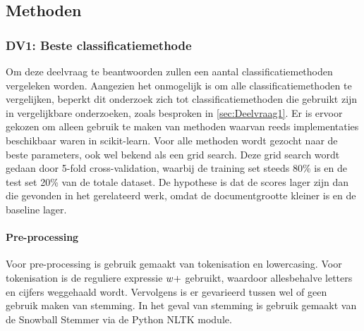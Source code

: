 \subsection{Methoden}


\subsubsection{DV1: Beste classificatiemethode}
Om deze deelvraag te beantwoorden zullen een aantal classificatiemethoden vergeleken worden. Aangezien het onmogelijk is om alle classificatiemethoden te vergelijken, beperkt dit onderzoek zich tot classificatiemethoden die gebruikt zijn in vergelijkbare onderzoeken, zoals besproken in \ref{sec:Deelvraag1}. Er is ervoor gekozen om alleen gebruik te maken van methoden waarvan reeds implementaties beschikbaar waren in scikit-learn. Voor alle methoden wordt gezocht naar de beste parameters, ook wel bekend als een grid search. Deze grid search wordt gedaan door 5-fold cross-validation, waarbij de training set steeds 80\% is en de test set 20\% van de totale dataset. De hypothese is dat de scores lager zijn dan die gevonden in het gerelateerd werk, omdat de documentgrootte kleiner is en de baseline lager.

\paragraph{Pre-processing}
Voor pre-processing is gebruik gemaakt van tokenisation en lowercasing. Voor tokenisation is de reguliere expressie $\\w+$ gebruikt, waardoor allesbehalve letters en cijfers weggehaald wordt. Vervolgens is er gevarieerd tussen wel of geen gebruik maken van stemming. In het geval van stemming is gebruik gemaakt van de Snowball Stemmer via de Python NLTK module.

